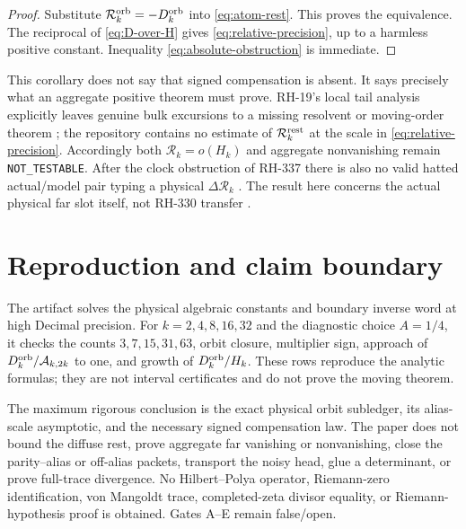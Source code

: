 \documentclass[11pt]{article}
\theoremstyle{remark}
\newcommand{\cA}{\mathcal A}
\newcommand{\cR}{\mathcal R}
\begin{document}
\begin{proof}
Substitute $\cR_k^{\rm orb}=-D_k^{\rm orb}$ into
\eqref{eq:atom-rest}.  This proves the equivalence.  The reciprocal of
\eqref{eq:D-over-H} gives \eqref{eq:relative-precision}, up to a harmless
positive constant.  Inequality \eqref{eq:absolute-obstruction} is immediate.
\end{proof}

This corollary does not say that signed compensation is absent.  It says
precisely what an aggregate positive theorem must prove.  RH-19's local tail
analysis explicitly leaves genuine bulk excursions to a missing resolvent
or moving-order theorem \citep{WangBoundaryTail2026}; the repository contains
no estimate of $\cR_k^{\rm rest}$ at the scale in
\eqref{eq:relative-precision}.  Accordingly both
$\cR_k=o(H_k)$ and aggregate nonvanishing remain
\texttt{NOT\_TESTABLE}.  After the clock obstruction of RH-337 there is also
no valid hatted actual/model pair typing a physical $\Delta\cR_k$
\citep{WangClockDrift2026}.  The result here concerns the actual physical far
slot itself, not RH-330 transfer \citep{WangTransfer2026}.

\section{Reproduction and claim boundary}

The artifact solves the physical algebraic constants and boundary inverse
word at high Decimal precision.  For $k=2,4,8,16,32$ and the diagnostic
choice $A=1/4$, it checks the counts $3,7,15,31,63$, orbit closure, multiplier
sign, approach of $D_k^{\rm orb}/\cA_{k,2k}$ to one, and growth of
$D_k^{\rm orb}/H_k$.  These rows reproduce the analytic formulas; they are
not interval certificates and do not prove the moving theorem.

The maximum rigorous conclusion is the exact physical orbit subledger,
its alias-scale asymptotic, and the necessary signed compensation law.  The
paper does not bound the diffuse rest, prove aggregate far vanishing or
nonvanishing, close the parity--alias or off-alias packets, transport the
noisy head, glue a determinant, or prove full-trace divergence.  No
Hilbert--Polya operator, Riemann-zero identification, von Mangoldt trace,
completed-zeta divisor equality, or Riemann-hypothesis proof is obtained.
Gates A--E remain false/open.



\end{document}
